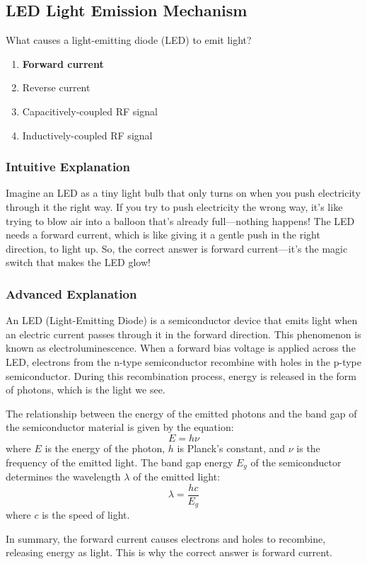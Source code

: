 \subsection{LED Light Emission Mechanism}
\label{T6B07}

\begin{tcolorbox}[colback=gray!10!white,colframe=black!75!black,title=T6B07]
What causes a light-emitting diode (LED) to emit light?
\begin{enumerate}[label=\Alph*)]
    \item \textbf{Forward current}
    \item Reverse current
    \item Capacitively-coupled RF signal
    \item Inductively-coupled RF signal
\end{enumerate}
\end{tcolorbox}

\subsubsection{Intuitive Explanation}
Imagine an LED as a tiny light bulb that only turns on when you push electricity through it the right way. If you try to push electricity the wrong way, it’s like trying to blow air into a balloon that’s already full—nothing happens! The LED needs a forward current, which is like giving it a gentle push in the right direction, to light up. So, the correct answer is forward current—it’s the magic switch that makes the LED glow!

\subsubsection{Advanced Explanation}
An LED (Light-Emitting Diode) is a semiconductor device that emits light when an electric current passes through it in the forward direction. This phenomenon is known as electroluminescence. When a forward bias voltage is applied across the LED, electrons from the n-type semiconductor recombine with holes in the p-type semiconductor. During this recombination process, energy is released in the form of photons, which is the light we see.

The relationship between the energy of the emitted photons and the band gap of the semiconductor material is given by the equation:
\[
E = h \nu
\]
where \(E\) is the energy of the photon, \(h\) is Planck's constant, and \(\nu\) is the frequency of the emitted light. The band gap energy \(E_g\) of the semiconductor determines the wavelength \(\lambda\) of the emitted light:
\[
\lambda = \frac{hc}{E_g}
\]
where \(c\) is the speed of light.

In summary, the forward current causes electrons and holes to recombine, releasing energy as light. This is why the correct answer is forward current.

